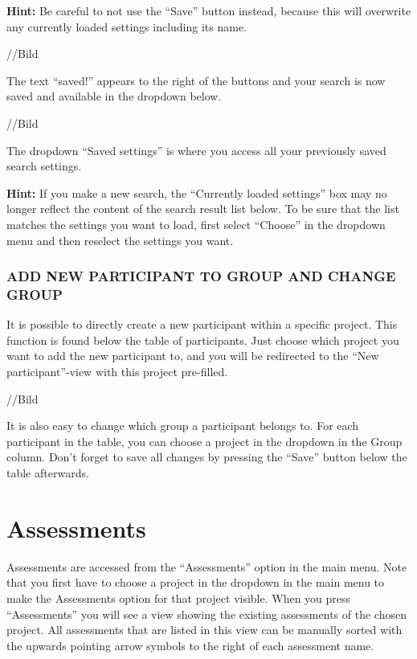 \documentclass[]{book}
\begin{document}
\textbf{Hint:} Be careful to not use the ``Save'' button instead, because this will overwrite any currently loaded settings including its name.

//Bild

The text ``saved!'' appears to the right of the buttons and your search is now saved and available in the dropdown below.

//Bild

The dropdown ``Saved settings'' is where you access all your previously saved search settings.

\textbf{Hint:} If you make a new search, the ``Currently loaded settings'' box may no longer reflect the content of the search result list below. To be sure that the list matches the settings you want to load, first select ``Choose'' in the dropdown menu and then reselect the settings you want.

\hypertarget{add-new-participant-to-group-and-change-group}{%
\subsection{ADD NEW PARTICIPANT TO GROUP AND CHANGE GROUP}\label{add-new-participant-to-group-and-change-group}}

It is possible to directly create a new participant within a specific project. This function is found below the table of participants. Just choose which project you want to add the new participant to, and you will be redirected to the ``New participant''-view with this project pre-filled.

//Bild

It is also easy to change which group a participant belongs to. For each participant in the table, you can choose a project in the dropdown in the Group column. Don't forget to save all changes by pressing the ``Save'' button below the table afterwards.

\hypertarget{assessments}{%
\chapter{Assessments}\label{assessments}}

Assessments are accessed from the ``Assessments'' option in the main menu. Note that you first have to choose a project in the dropdown in the main menu to make the Assessments option for that project visible. When you press ``Assessments'' you will see a view showing the existing assessments of the chosen project. All assessments that are listed in this view can be manually sorted with the upwards pointing arrow symbols to the right of each assessment name.
\end{document}
